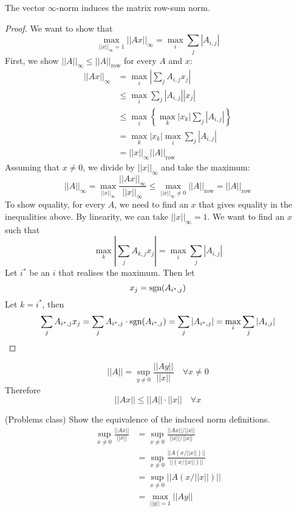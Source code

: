 \begin{proposition}
	The vector $\infty$-norm induces the matrix row-sum norm.
\end{proposition}

\begin{proof}
	We want to show that
	\[
		\max_{||x||_{\infty} = 1} ||Ax||_{\infty} = \max_i \sum_j |A_{i, j}|
	\]
	First, we show $||A||_{\infty} \le ||A||_{\text{row}}$ for every $A$ and $x$:
	\[
		\begin{aligned}
			||Ax||_{\infty}
				& = \max_i \left| \sum_j A_{i, j} x_j \right| \\
				& \le \max_i \sum_j |A_{i, j}| |x_j| \\
				& \le \max_i \left\{ \max_k |x_k| \sum_j |A_{i, j}| \right\} \\
				& = \max_k |x_k| \max_i \sum_j |A_{i, j}| \\
				& = ||x||_{\infty} ||A||_{\text{row}}
		\end{aligned}
	\]
	Assuming that $x \ne 0$, we divide by $||x||_{\infty}$ and take the maximum:
	\[
		||A||_{\infty} = \max_{||x||_{\infty}} \frac{||Ax||_{\infty}}{||x||_{\infty}} \le \max_{||x||_{\infty} \ne 0} ||A||_{\text{row}} = ||A||_{\text{row}}
	\]
	To show equality, for every $A$, we need to find an $x$ that gives equality in the inequalities above. By linearity, we can take $||x||_{\infty} = 1$. We want to find an $x$ such that
	\[
		\max_k \left| \sum_j A_{k, j} x_j \right| = \max_i \sum_j |A_{i, j}|
	\]
	Let $i^*$ be an $i$ that realises the maximum. Then let
	\[
		x_j = \text{sgn} (A_{i^*, j})
	\]
	Let $k = i^*$, then
	\[
		\sum_j A_{i^*, j} x_j = \sum_j A_{i^*, j} \cdot \text{sgn} (A_{i^*, j}) = \sum_j |A_{i^*, j}| = \max_i \sum_j |A_{i, j}|
	\]
\end{proof}

\begin{remark}
	\[
		||A|| = \sup_{y \ne 0} \frac{||Ay||}{||x||} \quad \forall x \ne 0
	\]
	Therefore
	\[
		||Ax|| \le ||A|| \cdot ||x|| \quad \forall x
	\]
\end{remark}

\begin{example}
	(Problems class) Show the equivalence of the induced norm definitions.
	\[
		\begin{aligned}
			\sup_{x \ne 0} \frac{||Ax||}{||x||}
				& = \sup_{x \ne 0} \frac{||Ax|| / ||x||}{||x|| / ||x||} \\
				& = \sup_{x \ne 0} \frac{||A (x / ||x||)||}{||(x / ||x||)||} \\
				& = \sup_{x \ne 0} ||A(x / ||x||)|| \\
				& = \max_{||y|| = 1} ||Ay||
		\end{aligned}
	\]
\end{example}

